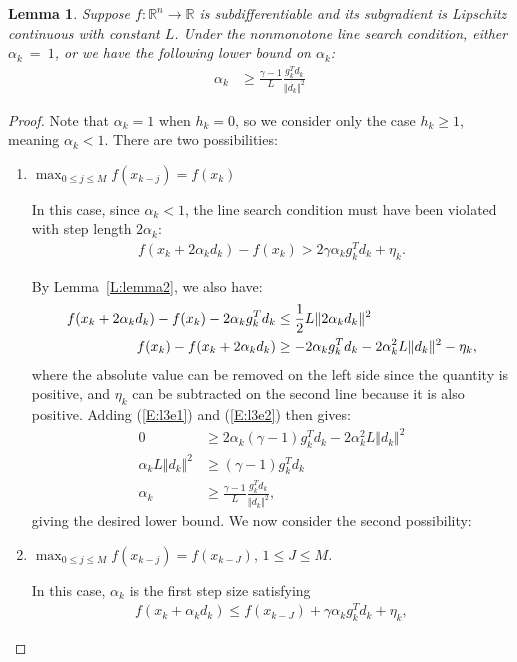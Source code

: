 \documentclass[]{interact}
\theoremstyle{plain}%
\newtheorem{lemma}[theorem]{Lemma}
\theoremstyle{definition}
\theoremstyle{remark}
\begin{document}
\begin{lemma}\label{L:lemma3} Suppose $f: \mathbb{R}^n \to \mathbb{R}$ is subdifferentiable and its subgradient is Lipschitz continuous with constant $L$. Under the nonmonotone line search condition, either $\alpha_k~=~1$, or we have the following lower bound on $\alpha_k$:
\begin{align*}
\alpha_k &\geq \frac{\gamma-1}{L} \frac{g_k^T d_k}{\Vert d_k \Vert^2}
\end{align*}
\end{lemma}
\begin{proof} Note that $\alpha_k = 1$ when $h_k = 0$, so we consider only the case $h_k \geq 1$, meaning $\alpha_k < 1$. There are two possibilities:
\begin{enumerate}
\item $\displaystyle \max_{0 \leq j \leq M} f(x_{k-j}) = f(x_k)$

In this case, since $\alpha_k < 1$, the line search condition must have been violated with step length $2 \alpha_k$:
\begin{align}
f(x_k + 2 \alpha_k d_k) - f(x_{k}) > 2\gamma \alpha_k g_k^T d_k + \eta_k.\label{E:l3e1}
\end{align}

By Lemma~\ref{L:lemma2}, we also have:
\begin{align}
f(x_k + 2 \alpha_k d_k) - f(x_{k}) -2  \alpha_k g_k^T d_k &\leq \frac{1}{2} L \Vert 2 \alpha_k d_k \Vert^2 \notag\\
f(x_{k}) - f(x_k + 2 \alpha_k d_k)  &\geq -2  \alpha_k g_k^T d_k - 2 \alpha_k^2 L \Vert d_k \Vert^2 -\eta_k,\label{E:l3e2}
\end{align}
where the absolute value can be removed on the left side since the quantity is positive, and $\eta_k$ can be subtracted on the second line because it is also positive. Adding (\ref{E:l3e1}) and (\ref{E:l3e2}) then gives:
\begin{align*}
0 &\geq 2\alpha_k (\gamma - 1)g_k^T d_k - 2 \alpha_k^2 L\Vert d_k \Vert ^2   \\
\alpha_k L\Vert d_k \Vert ^2 &\geq (\gamma - 1) g_k^T d_k \\
\alpha_k &\geq \frac{\gamma-1}{L} \frac{g_k^T d_k}{\Vert d_k \Vert^2},
\end{align*}
giving the desired lower bound. We now consider the second possibility:
\item  $\displaystyle \max_{0 \leq j \leq M} f(x_{k-j}) = f(x_{k-J})$, $1 \leq J \leq M$.

In this case, $\alpha_k$ is the first step size satisfying 
\begin{align*}
f(x_k + \alpha_k d_k ) \leq  f(x_{k-J}) + \gamma \alpha_k g_k^T d_k + \eta_k,
\end{align*}


\end{enumerate}
\end{proof}
\end{document}
